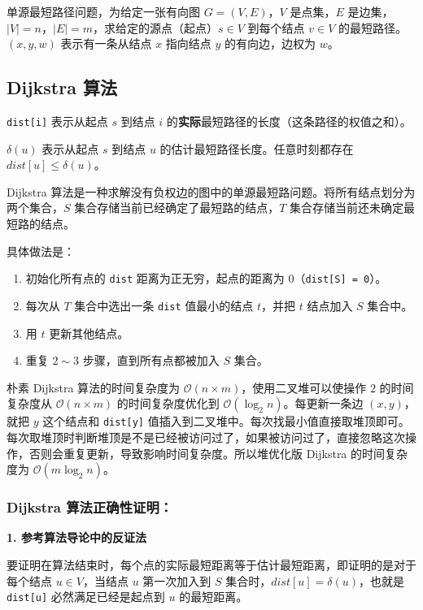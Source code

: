 

单源最短路径问题，为给定一张有向图 $G = (V, E)$，$V$ 是点集，$E$ 是边集，$|V|= n$，$|E| = m$，求给定的源点（起点）$s \in V$ 到每个结点 $v \in V$ 的最短路径。$(x, y, w)$ 表示有一条从结点 $x$ 指向结点 $y$ 的有向边，边权为 $w$。

\subsection{Dijkstra 算法}

\verb|dist[i]| 表示从起点 $s$ 到结点 $i$ 的\textbf{实际}最短路径的长度（这条路径的权值之和）。

$\delta(u)$ 表示从起点 $s$ 到结点 $u$ 的估计最短路径长度。任意时刻都存在 $dist[u] \leq \delta(u)$。
   
Dijkstra 算法是一种求解没有负权边的图中的单源最短路问题。将所有结点划分为两个集合，$S$ 集合存储当前已经确定了最短路的结点，$T$ 集合存储当前还未确定最短路的结点。

具体做法是：
\begin{enumerate}
\item 初始化所有点的 \verb|dist| 距离为正无穷，起点的距离为 $0$（\verb|dist[S] = 0|）。
\item 每次从 $T$ 集合中选出一条 \verb|dist| 值最小的结点 $t$，并把 $t$ 结点加入 $S$ 集合中。
\item 用 $t$ 更新其他结点。
\item 重复 $2 \sim 3$ 步骤，直到所有点都被加入 $S$ 集合。
\end{enumerate}

朴素 Dijkstra 算法的时间复杂度为 $\mathcal{O}(n \times m)$，使用二叉堆可以使操作 $2$ 的时间复杂度从 $\mathcal{O}(n \times m)$ 的时间复杂度优化到 $\mathcal{O}(\log_2 n)$。每更新一条边 $(x, y)$，就把 $y$ 这个结点和 \verb|dist[y]| 值插入到二叉堆中。每次找最小值直接取堆顶即可。每次取堆顶时判断堆顶是不是已经被访问过了，如果被访问过了，直接忽略这次操作，否则会重复更新，导致影响时间复杂度。所以堆优化版 Dijkstra 的时间复杂度为 $\mathcal{O}(m \log_2 n)$。

\subsubsection{Dijkstra 算法正确性证明：}

\textbf{1. 参考算法导论中的反证法}

要证明在算法结束时，每个点的实际最短距离等于估计最短距离，即证明的是对于每个结点 $u \in V$，当结点 $u$ 第一次加入到 $S$ 集合时，$dist[u] =\delta(u)$，也就是 \verb|dist[u]| 必然满足已经是起点到 $u$ 的最短距离。

